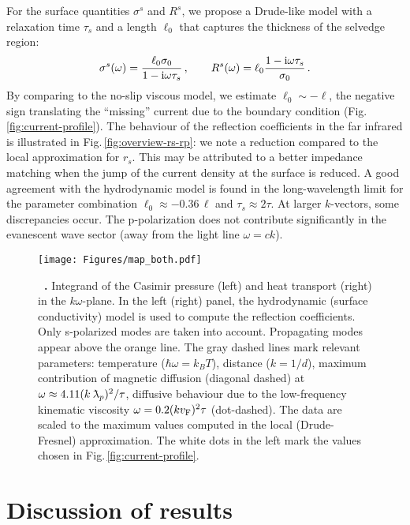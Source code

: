\documentclass[11pt, oneside]{article}   	%
\newcommand{\lambdabar}{{\mkern+04mu\mathchar'26\mkern-09mu\lambda}}
\def\surconduct{{\sigma^s}}
\def\surresist{{R^s}}
\def\surfacelength{{\ell_0}}
\renewcommand{\caption}[2][]{\refstepcounter{figure}%
\vspace*{1ex}\hspace*{8.5ex}%
\parbox{0.8\textwidth}{\small
\textbf{\figurename~\arabic{figure}.} #2}}
\begin{document}
For the surface quantities $\surconduct$ and $\surresist$, we propose a Drude-like model
with a relaxation time $\tau_s$ and a length $\ell_0$ that captures 
the thickness of the selvedge region:
\begin{equation}
\surconduct(\omega) = \frac{\surfacelength\sigma_0}{1- {\rm i}\omega \tau_s} \, , 
\qquad
\surresist(\omega) = \surfacelength \frac{1- {\rm i}\omega \tau_s}{\sigma_0}\, .
\label{eq:simple-model-surface-conductivity}
\end{equation}
By comparing to the no-slip viscous model, we estimate $\ell_0 \sim -\ell$, the negative
sign translating the ``missing'' current due to the boundary condition
(Fig.\,\ref{fig:current-profile}).
The behaviour of the reflection coefficients in the far infrared is illustrated in 
Fig.\,\ref{fig:overview-rs-rp}: we note a reduction compared to the local approximation for $r_s$.
This may be attributed to a better impedance matching when the jump of the 
current density at the surface is reduced. A good agreement with the hydrodynamic model 
is found in the long-wavelength limit for
the parameter combination $\ell_0 \approx -0.36\,\ell$ and $\tau_s \approx 2 \tau$.
At larger $k$-vectors, some discrepancies occur. The p-polarization does not contribute
significantly in the evanescent wave sector (away from the light line $\omega = c k$).



\begin{figure}[bth]
\centerline{%
\texttt{[image: Figures/map\_both.pdf]}
}
\caption[]{Integrand of the Casimir pressure (left) and heat transport 
(right) in the $k\omega$-plane.
In the left (right) panel, the hydrodynamic (surface conductivity) model is used
to compute the reflection coefficients. Only s-polarized modes are taken into
account. Propagating modes appear above the orange line.
The gray dashed lines mark relevant parameters: temperature ($\hbar\omega = k_B T$), 
distance ($k = 1/d$),
maximum contribution of magnetic diffusion (diagonal dashed) at
$\omega \approx 4.11 (k \lambdabar_p)^2/\tau$, 
diffusive behaviour due to the low-frequency kinematic viscosity
$\omega = 0.2 (k v_{\rm F})^2 \tau$ (dot-dashed).
The data are scaled to the maximum values computed in the local (Drude-Fresnel)
approximation. The white dots in the left mark the values chosen
in Fig.\,\ref{fig:current-profile}.
}
\label{fig:map_both}
\end{figure}


\section{Discussion of results}
\label{s:discussion}
\end{document}
